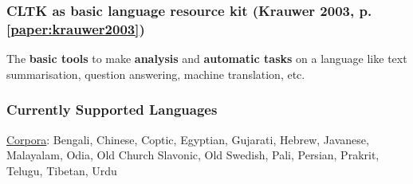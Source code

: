 \documentclass{beamer}
\begin{document}
\begin{frame}
\frametitle{CLTK as \textbf{b}asic \textbf{la}nguage \textbf{r}esource \textbf{k}it (Krauwer 2003, p. \ref{paper:krauwer2003})}
The \textbf{basic tools} to make \textbf{analysis} and \textbf{automatic tasks} on a language like text summarisation, question answering, machine translation, etc.

\end{frame}




\begin{frame}
\frametitle{Currently Supported Languages}

\underline{Corpora}: Bengali, Chinese, Coptic, Egyptian, Gujarati, Hebrew, Javanese, Malayalam, Odia, Old Church Slavonic, Old Swedish, Pali, Persian, Prakrit, Telugu, Tibetan, Urdu
\end{frame}
\end{document}
